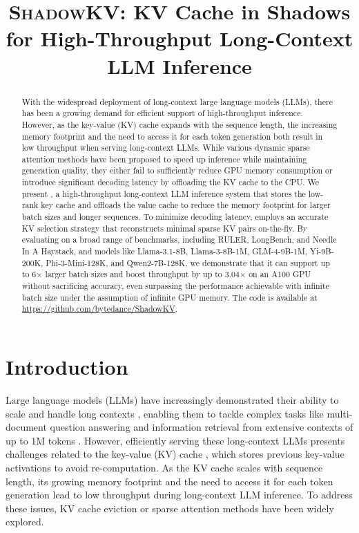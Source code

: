 \title{\textsc{ShadowKV}: KV Cache in Shadows for High-Throughput Long-Context LLM Inference}



\maketitle
\begin{abstract}
With the widespread deployment of long-context large language models (LLMs), there has been a growing demand for efficient support of high-throughput inference. However, as the key-value (KV) cache expands with the sequence length, the increasing memory footprint and the need to access it for each token generation both result in low throughput when serving long-context LLMs. While various dynamic sparse attention methods have been proposed to speed up inference while maintaining generation quality, they either fail to sufficiently reduce GPU memory consumption or introduce significant decoding latency by offloading the KV cache to the CPU. We present \Sys, a high-throughput long-context LLM inference system that stores the low-rank key cache and offloads the value cache to reduce the memory footprint for larger batch sizes and longer sequences. To minimize decoding latency, \Sys employs an accurate KV selection strategy that reconstructs minimal sparse KV pairs on-the-fly. By evaluating \Sys on a broad range of benchmarks, including RULER, LongBench, and Needle In A Haystack, and models like Llama-3.1-8B, Llama-3-8B-1M, GLM-4-9B-1M, Yi-9B-200K, Phi-3-Mini-128K, and Qwen2-7B-128K, we demonstrate that it can support up to 6$\times$ larger batch sizes and boost throughput by up to 3.04$\times$ on an A100 GPU without sacrificing accuracy, even surpassing the performance achievable with infinite batch size under the assumption of infinite GPU memory. The code is available at \url{https://github.com/bytedance/ShadowKV}.
\end{abstract}

\section{Introduction}
Large language models (LLMs) have increasingly demonstrated their ability to scale and handle long contexts \citep{bingchat, liu2024world, achiam2023gpt, team2023gemini}, enabling them to tackle complex tasks like multi-document question answering and information retrieval from extensive contexts of up to 1M tokens \citep{achiam2023gpt,wang2024loong}. However, efficiently serving these long-context LLMs presents challenges related to the key-value (KV) cache \citep{liu2024scissorhands, ge2023model}, which stores previous key-value activations to avoid re-computation. As the KV cache scales with sequence length, its growing memory footprint and the need to access it for each token generation lead to low throughput during long-context LLM inference. To address these issues, KV cache eviction or sparse attention methods have been widely explored.

